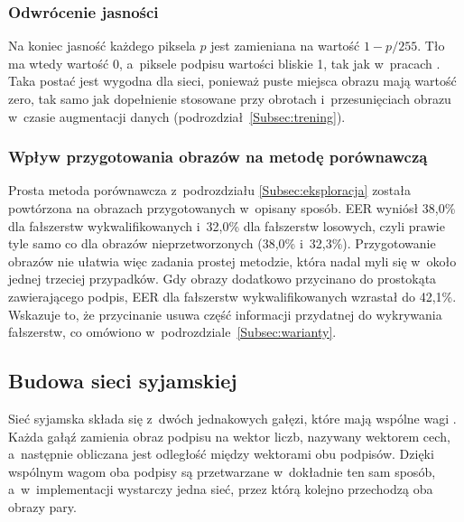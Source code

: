 \documentclass[12pt, twoside, openright]{article}
\begin{document}
\subsubsection*{Odwrócenie jasności}

Na koniec jasność każdego piksela $p$ jest zamieniana na wartość $1 - p/255$.
Tło ma wtedy wartość 0, a~piksele podpisu wartości bliskie 1, tak jak w~pracach \cite{dey2017, hafemann2017features}.
Taka postać jest wygodna dla sieci, ponieważ puste miejsca obrazu mają wartość zero, tak samo jak dopełnienie stosowane przy obrotach i~przesunięciach obrazu w~czasie augmentacji danych (podrozdział~\ref{Subsec:trening}).

\subsubsection*{Wpływ przygotowania obrazów na metodę porównawczą}

Prosta metoda porównawcza z~podrozdziału \ref{Subsec:eksploracja} została powtórzona na obrazach przygotowanych w~opisany sposób.
EER wyniósł 38,0\% dla fałszerstw wykwalifikowanych i~32,0\% dla fałszerstw losowych, czyli prawie tyle samo co dla obrazów nieprzetworzonych (38,0\% i~32,3\%).
Przygotowanie obrazów nie ułatwia więc zadania prostej metodzie, która nadal myli się w~około jednej trzeciej przypadków.
Gdy obrazy dodatkowo przycinano do prostokąta zawierającego podpis, EER dla fałszerstw wykwalifikowanych wzrastał do 42,1\%.
Wskazuje to, że przycinanie usuwa część informacji przydatnej do wykrywania fałszerstw, co omówiono w~podrozdziale~\ref{Subsec:warianty}.

\subsection{Budowa sieci syjamskiej}
\label{Subsec:siec}

Sieć syjamska składa się z~dwóch jednakowych gałęzi, które mają wspólne wagi \cite{bromley1993}.
Każda gałąź zamienia obraz podpisu na wektor liczb, nazywany wektorem cech, a~następnie obliczana jest odległość między wektorami obu podpisów.
Dzięki wspólnym wagom oba podpisy są przetwarzane w~dokładnie ten sam sposób, a~w~implementacji wystarczy jedna sieć, przez którą kolejno przechodzą oba obrazy pary.
\end{document}
